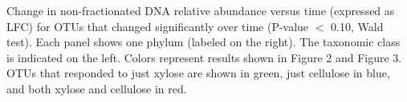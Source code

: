 Change in non-fractionated DNA relative abundance versus time (expressed
as LFC) for OTUs that changed significantly over time (P-value $<$ 0.10, Wald test).
Each panel shows one phylum (labeled on the right). The taxonomic class is
indicated on the left. Colors represent results shown in Figure 2 and
Figure 3.  OTUs that responded to just xylose are shown in 
green, just cellulose in blue, and both xylose and cellulose in red.  

